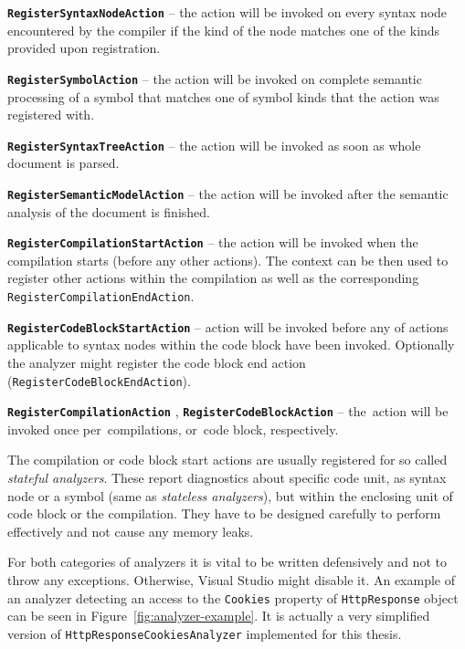 \documentclass[
  digital, %
  table,   %
  lof,     %
  lot,     %
  oneside,
]{fithesis3}
\begin{document}
\smallskip
\begin{compactitem}
  \item[\texttt{\textbf{RegisterSyntaxNodeAction}}] -- the action will be invoked on every syntax node encountered by the compiler if the kind of the node matches one of the kinds provided upon registration.
  
  \item[\texttt{\textbf{RegisterSymbolAction}}] -- the action will be invoked on complete semantic processing of a symbol that matches one of symbol kinds that the action was registered with.
  
  \item[\texttt{\textbf{RegisterSyntaxTreeAction}}] -- the action will be invoked as soon as whole document is parsed.
  
  \item[\texttt{\textbf{RegisterSemanticModelAction}}] -- the action will be invoked after the semantic analysis of the document is finished.
  
  \item[\texttt{\textbf{RegisterCompilationStartAction}}] -- the action will be invoked when the compilation starts (before any other actions). The context can be then used to register other actions within the compilation as well as the corresponding \texttt{RegisterCompilationEndAction}.
  
  \item[\texttt{\textbf{RegisterCodeBlockStartAction}}] -- action will be invoked before any of actions applicable to syntax nodes within the code block have been invoked. Optionally the analyzer might register the code block end action (\texttt{RegisterCodeBlockEndAction}).
  
  \item[\texttt{\textbf{RegisterCompilationAction}}], \texttt{\textbf{RegisterCodeBlockAction}} -- the~action will be invoked once per~compilations, or~code block, respectively.
\end{compactitem}

The compilation or code block start actions are usually registered for so called \textit{stateful analyzers}. These report diagnostics about specific code unit, as syntax node or a symbol (same as \textit{stateless analyzers}), but within the enclosing unit of code block or the compilation. They have to be designed carefully to perform effectively and not cause any memory leaks.

For both categories of analyzers it is vital to be written defensively and not to throw any exceptions. Otherwise, Visual Studio might disable it. An example of an analyzer detecting an access to the \texttt{Cookies} property of \texttt{HttpResponse} object can be seen in Figure~\ref{fig:analyzer-example}. It is actually a very simplified version of \texttt{HttpResponseCookiesAnalyzer} implemented for this thesis.
\end{document}
